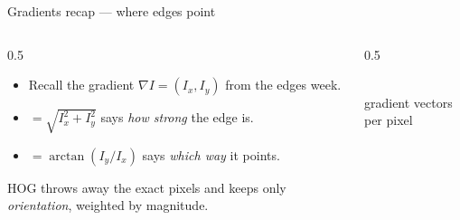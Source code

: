 \documentclass[10pt,aspectratio=169]{beamer}
\begin{document}
\begin{frame}{Gradients recap — where edges point}
  \begin{columns}[T]
    \begin{column}{0.5\textwidth}
      \begin{itemize}
        \item Recall the gradient $\nabla I = (I_x, I_y)$ from the edges week.
        \item {} $=\sqrt{I_x^2+I_y^2}$ says \emph{how strong} the edge is.
        \item {} $=\arctan(I_y/I_x)$ says \emph{which way} it points.
      \end{itemize}
      HOG throws away the exact pixels and keeps only \emph{orientation}, weighted by magnitude.
    \end{column}
    \begin{column}{0.5\textwidth}
      \begin{center}
      \\
      {\scriptsize gradient vectors per pixel}
      \end{center}
    \end{column}
  \end{columns}
\end{frame}
\end{document}
